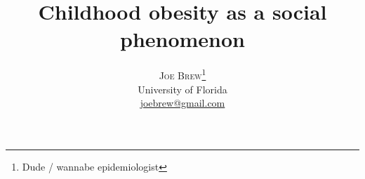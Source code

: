 \title{\vspace{-15mm}\fontsize{24pt}{10pt}\selectfont\textbf{Childhood obesity as a social phenomenon}} %

\author{
\large
\textsc{Joe Brew}\thanks{Dude / wannabe epidemiologist}\\[2mm] %
\normalsize University of Florida \\ %
\normalsize \href{mailto:joebrew@gmail.com}{joebrew@gmail.com} %
\vspace{-5mm}
}
\date{}


\usepackage{Sweave}



\maketitle %

\thispagestyle{fancy} %


% 
% 


